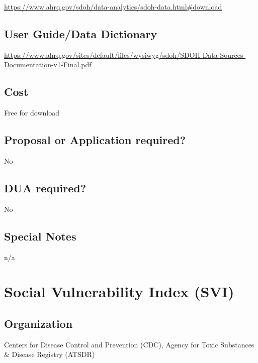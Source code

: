 \documentclass[
]{book}
\begin{document}
\url{https://www.ahrq.gov/sdoh/data-analytics/sdoh-data.html\#download}

\hypertarget{user-guidedata-dictionary-81}{%
\section{User Guide/Data Dictionary}\label{user-guidedata-dictionary-81}}

\url{https://www.ahrq.gov/sites/default/files/wysiwyg/sdoh/SDOH-Data-Sources-Documentation-v1-Final.pdf}

\hypertarget{cost-81}{%
\section{Cost}\label{cost-81}}

Free for download

\hypertarget{proposal-or-application-required-81}{%
\section{Proposal or Application required?}\label{proposal-or-application-required-81}}

No

\hypertarget{dua-required-81}{%
\section{DUA required?}\label{dua-required-81}}

No

\hypertarget{special-notes-81}{%
\section{Special Notes}\label{special-notes-81}}

n/a

\mainmatter

\hypertarget{social-vulnerability-index-svi}{%
\chapter{Social Vulnerability Index (SVI)}\label{social-vulnerability-index-svi}}

\hypertarget{organization-82}{%
\section{Organization}\label{organization-82}}

Centers for Disease Control and Prevention (CDC), Agency for Toxic Substances \& Disease Registry (ATSDR)
\end{document}
